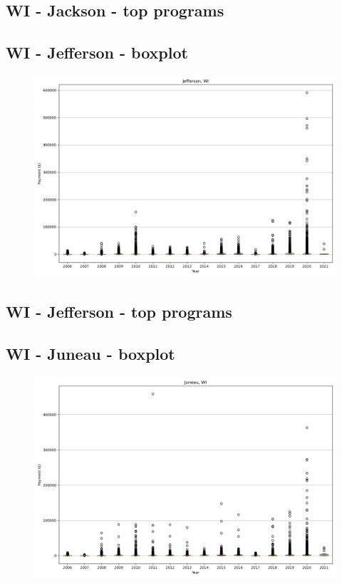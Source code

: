 \subsection*{WI - Jackson - top programs}

\newpage
\subsection*{WI - Jefferson - boxplot}
\begin{figure}[h]
\centering
\includegraphics[width=7in]{../output/boxplots/counties/Jefferson-WI_boxplot.png}
\end{figure}


\subsection*{WI - Jefferson - top programs}

\newpage
\subsection*{WI - Juneau - boxplot}
\begin{figure}[h]
\centering
\includegraphics[width=7in]{../output/boxplots/counties/Juneau-WI_boxplot.png}
\end{figure}


